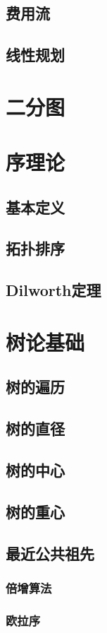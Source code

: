 \documentclass[12pt,a4paper]{article}
\begin{document}
\subsection{费用流}
\subsection{线性规划}
\newpage
\section{二分图}
\section{序理论}
\subsection{基本定义}
\subsection{拓扑排序}
\subsection{Dilworth定理}
\newpage
\section{树论基础}
\subsection{树的遍历}
\subsection{树的直径}
\subsection{树的中心}
\subsection{树的重心}
\subsection{最近公共祖先}
\subsubsection{倍增算法}
\subsubsection{欧拉序}
\end{document}
